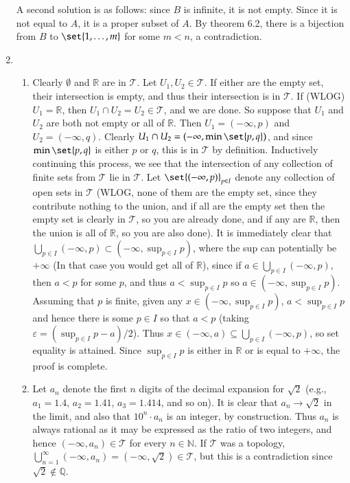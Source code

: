\documentclass[12pt]{article}
\theoremstyle{definitionstyle}
\def\mbb#1{\mathbb{#1}}
\def\bN{\mbb{N}}
\def \R{\mbb{R}}
\def\bQ{\mbb{Q}}
\def \ve{\varepsilon}
\begin{document}
\begin{enumerate}[leftmargin=\labelsep]
		A second solution is as follows: since $B$ is infinite, it is not empty. Since it is not equal to $A$, it is a proper subset of $A$. By theorem 6.2, there is a bijection from $B$ to $\set{1, \ldots, m}$ for some $m < n$, a contradiction.
		
		\item \begin{enumerate}
			\item Clearly $\emptyset$ and $\R$ are in $\mathcal T$. Let $U_1, U_2 \in \mathcal T$. If either are the empty set, their intersection is empty, and thus their intersection is in $\mathcal T$. If (WLOG) $U_1 = \R$, then $U_1 \cap U_2 = U_2 \in \mathcal T$, and we are done. So suppose that $U_1$ and $U_2$ are both not empty or all of $\R$. Then $U_1 = (-\infty, p)$ and $U_2 = (-\infty, q)$. Clearly $U_1 \cap U_2 = (-\infty, \min\set{p, q})$, and since $\min\set{p, q}$ is either $p$ or $q$, this is in $\mathcal T$ by definition. Inductively continuing this process, we see that the intersection of any collection of finite sets from $\mathcal T$ lie in $\mathcal T$. Let $\set{(-\infty, p)}_{p \in I}$ denote any collection of open sets in $\mathcal T$ (WLOG, none of them are the empty set, since they contribute nothing to the union, and if all are the empty set then the empty set is clearly in $\mathcal T$, so you are already done, and if any are $\R$, then the union is all of $\R$, so you are also done). It is immediately clear that $\bigcup_{p \in I} (-\infty, p) \subset (-\infty, \sup_{p \in I} p)$, where the sup can potentially be $+\infty$ (In that case you would get all of $\R$), since if $a \in \bigcup_{p \in I} (-\infty, p)$, then $a < p$ for some $p$, and thus $a < \sup_{p \in I} p$ so $a \in (-\infty, \sup_{p \in I} p)$. Assuming that $p$ is finite, given any $x \in (-\infty, \sup_{p \in I} p)$, $a < \sup_{p \in I} p$ and hence there is some $p \in I$ so that $a < p$ (taking $\ve = (\sup_{p \in I} p - a)/2$). Thus $x \in (-\infty, a)\subseteq\bigcup_{p \in I} (-\infty, p)$, so set equality is attained. Since $\sup_{p \in I} p$ is either in $\R$ or is equal to $+\infty$, the proof is complete.
			
			\item Let $a_n$ denote the first $n$ digits of the decimal expansion for $\sqrt{2}$ (e.g., $a_1 = 1.4$, $a_2 = 1.41$, $a_3 = 1.414$, and so on). It is clear that $a_n \to \sqrt{2}$ in the limit, and also that $10^n \cdot a_n$ is an integer, by construction. Thus $a_n$ is always rational as it may be expressed as the ratio of two integers, and hence $(-\infty, a_n) \in \mathcal T$ for every $n \in \bN$. If $\mathcal T$ was a topology, $\bigcup_{n=1}^\infty (-\infty, a_n) = (-\infty, \sqrt{2}) \in \mathcal T$, but this is a contradiction since $\sqrt{2} \not \in \bQ$.
		\end{enumerate}
	\end{enumerate}
\end{document}
